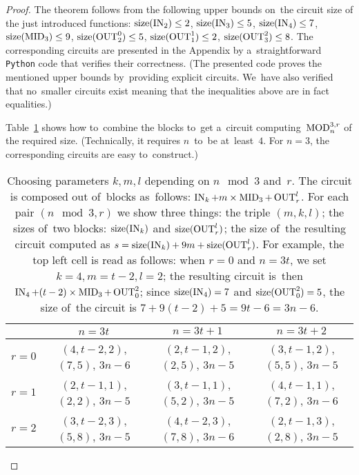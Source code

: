 \begin{proof}
The theorem follows from the following upper bounds
on~the circuit size of the just introduced functions:
$\operatorname{size}(\operatorname{IN}_2) \le 2$,
$\operatorname{size}(\operatorname{IN}_3) \le 5$,
$\operatorname{size}(\operatorname{IN}_4) \le 7$,
$\operatorname{size}(\operatorname{MID}_3) \le 9$,
$\operatorname{size}(\operatorname{OUT}_2^0) \le 5$,
$\operatorname{size}(\operatorname{OUT}_1^1) \le 2$,
$\operatorname{size}(\operatorname{OUT}_3^2) \le 8$.
The corresponding circuits are presented in the Appendix
by a~straightforward \texttt{Python} code that verifies their correctness. (The presented code proves the mentioned upper bounds by~providing explicit circuits. We~have also verified that no~smaller circuits exist meaning that the
inequalities above are in fact equalities.)

Table~\ref{table:parameters} shows how to~combine
the blocks
to~get a~circuit computing~$\operatorname{MOD}_n^{3,r}$ of the required size. (Technically, it requires $n$~to~be at~least~$4$. For $n=3$, the corresponding circuits are easy to~construct.)

\begin{table}
\begin{center}
\begin{tabular}{cccc}
\toprule
& $n=3t$ & $n=3t+1$ & $n=3t+2$\\
\midrule
$r=0$
& $(4, t-2, 2)$, $(7, 5)$, $3n-6$
& $(2, t-1, 2)$, $(2, 5)$, $3n-5$
& $(3, t-1, 2)$, $(5, 5)$, $3n-5$
\\
$r=1$
& $(2, t-1, 1)$, $(2, 2)$, $3n-5$
& $(3, t-1, 1)$, $(5, 2)$, $3n-5$
& $(4, t-1, 1)$, $(7, 2)$, $3n-6$
\\
$r=2$
& $(3, t-2, 3)$, $(5, 8)$, $3n-5$
& $(4, t-2, 3)$, $(7, 8)$, $3n-6$
& $(2, t-1, 3)$, $(2, 8)$, $3n-5$
\\
\bottomrule
\end{tabular}
\end{center}
\caption{Choosing parameters $k, m, l$ depending on $n \mod 3$ and~$r$. The circuit is composed out of~blocks
as~follows: $\operatorname{IN}_k + m \times \operatorname{MID}_3 + \operatorname{OUT}_r^l$. For each
pair $(n \mod 3, r)$ we show three things: the triple
$(m, k, l)$; the sizes of~two blocks: $\operatorname{size}(\operatorname{IN}_k)$ and $\operatorname{size}(\operatorname{OUT}_r^l)$; the size of~the resulting circuit
computed as $s=\operatorname{size}(\operatorname{IN}_k)+9m+\operatorname{size}(\operatorname{OUT}_r^l)$. For example, the top left cell is read as follows: when $r=0$ and $n=3t$, we set $k=4,m=t-2,l=2$; the resulting circuit
is~then $\operatorname{IN}_4 + (t-2) \times \operatorname{MID}_3 + \operatorname{OUT}_0^2$; since $\operatorname{size}(\operatorname{IN}_4)=7$ and $\operatorname{size}(\operatorname{OUT}_0^2)=5$, the size of~the circuit is $7+9(t-2)+5=9t-6=3n-6$.}
\label{table:parameters}
\end{table}
\end{proof}

